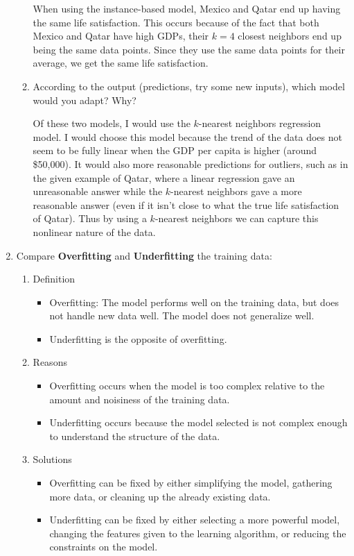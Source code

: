 \documentclass[a4paper,10pt]{article}
\begin{document}
\begin{enumerate}
\begin{enumerate}
			When using the instance-based model, Mexico and Qatar end up having the same life satisfaction.
			This occurs because of the fact that both Mexico and Qatar have high GDPs, their \( k=4 \) closest neighbors end up being the same data points.
			Since they use the same data points for their average, we get the same life satisfaction.
			
		\item According to the output (predictions, try some new inputs), which model would you adapt? Why?
		
		Of these two models, I would use the \( k \)-nearest neighbors regression model. 
		I would choose this model because the trend of the data does not seem to be fully linear when the GDP per capita is higher (around \$50,000).
		It would also more reasonable predictions for outliers, such as in the given example of Qatar, where a linear regression gave an unreasonable answer while the \( k \)-nearest neighbors gave a more reasonable answer (even if it isn't close to what the true life satisfaction of Qatar).
		Thus by using a \( k \)-nearest neighbors we can capture this nonlinear nature of the data.
	\end{enumerate}
	
	\item Compare \textbf{Overfitting} and \textbf{Underfitting} the training data:
	\begin{enumerate}
		\item Definition
		\begin{itemize}
			\item Overfitting: The model performs well on the training data, but does not handle new data well. The model does not generalize well.
			\item Underfitting is the opposite of overfitting. 
		\end{itemize}
		\item Reasons
		\begin{itemize}
			\item Overfitting occurs when the model is too complex relative to the amount and noisiness of the training data.
			\item Underfitting occurs because the model selected is not complex enough to understand the structure of the data.
		\end{itemize}
		\item Solutions
		\begin{itemize}
			\item Overfitting can be fixed by either simplifying the model, gathering more data, or cleaning up the already existing data.
			\item Underfitting can be fixed by either selecting a more powerful model, changing the features given to the learning algorithm, or reducing the constraints on the model.
		\end{itemize}
	\end{enumerate}
	

\end{enumerate}
\end{document}
